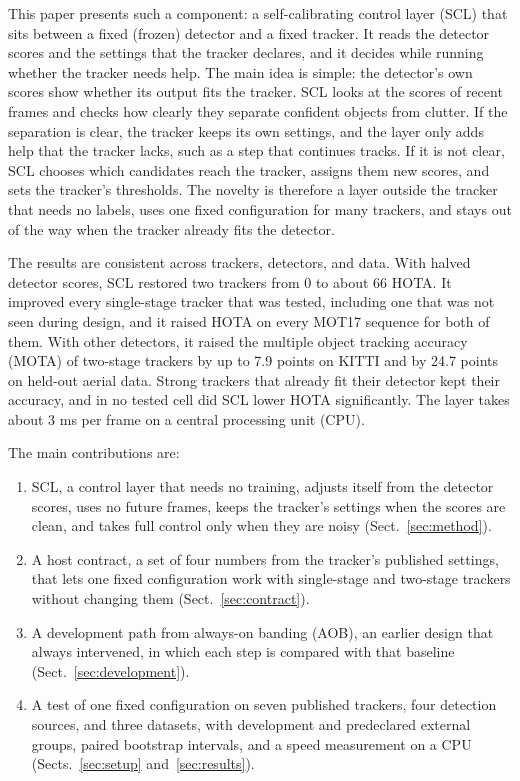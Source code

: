 \documentclass[pdflatex,referee,sn-mathphys-num]{sn-jnl}
\newcommand{\scl}{SCL}
\newcommand{\aob}{AOB}
\begin{document}
This paper presents such a component: a self-calibrating control layer (\scl{})
that sits between a fixed (frozen) detector and a fixed tracker. It reads the
detector scores and the settings that the tracker declares, and it decides
while running whether the tracker needs help. The main idea is simple: the
detector's own scores show whether its output fits the tracker. \scl{} looks
at the scores of recent frames and checks how clearly they separate confident
objects from clutter. If the separation is clear, the tracker keeps its own
settings, and the layer only adds help that the tracker lacks, such as a step
that continues tracks. If it is not clear, \scl{} chooses which candidates
reach the tracker, assigns them new scores, and sets the tracker's thresholds.
The novelty is therefore a layer outside the tracker that needs no labels,
uses one fixed configuration for many trackers, and stays out of the way when
the tracker already fits the detector.

The results are consistent across trackers, detectors, and data. With
halved detector scores, \scl{} restored two trackers from 0 to about 66
HOTA. It improved every single-stage tracker that was tested, including one
that was not seen during design, and it raised HOTA on every MOT17 sequence
for both of them. With other detectors, it raised the multiple object
tracking accuracy (MOTA) of two-stage trackers by up to 7.9 points on KITTI
and by 24.7 points on held-out aerial data. Strong trackers that already fit
their detector kept their accuracy, and in no tested cell did \scl{} lower
HOTA significantly. The layer takes about 3 ms per frame on a central processing unit (CPU).

The main contributions are:
\begin{enumerate}
\item \scl{}, a control layer that needs no training, adjusts itself from the
      detector scores, uses no future frames, keeps the tracker's settings
      when the scores are clean, and takes full control only when they are
      noisy (Sect.~\ref{sec:method}).
\item A host contract, a set of four numbers from the tracker's published
      settings, that lets one fixed configuration work with single-stage and
      two-stage trackers without changing them (Sect.~\ref{sec:contract}).
\item A development path from always-on banding (\aob{}), an earlier design
      that always intervened, in which each step is compared with that
      baseline (Sect.~\ref{sec:development}).
\item A test of one fixed configuration on seven published trackers, four
      detection sources, and three datasets, with development and predeclared
      external groups, paired bootstrap intervals, and a speed measurement on
      a CPU (Sects.~\ref{sec:setup} and~\ref{sec:results}).
\end{enumerate}
\end{document}
